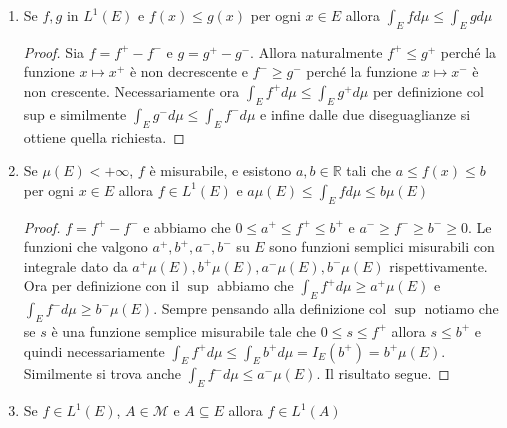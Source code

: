 \begin{enumerate}[label = \arabic*.]
\begin{proof}
         Ora possiamo estendere a \(f\) misurabile e \(\alpha \in \mathbb{R}\)
         scrivendo \(f = f^{+} - f^{-}\) e osservando che \(\alpha f =
         \text{sign}(\alpha) |\alpha| f^{+} - \text{sign}(\alpha) |\alpha|
         f^{-}\) dove se \(\alpha < 0\)  allora \(-\text{sign}(\alpha) f^{-}\) e
     \(- \text{sign}(\alpha) f^{+}\) sono non negative e misurabili.
    \end{proof}
    \item Se \(f, g\) in \(L^{1}(E)\) e \(f(x) \le g(x)\) per ogni \(x \in E\)
        allora \(\int_{E} f d\mu \le \int_{E} g d\mu\)
    \begin{proof}
        Sia \(f = f^{+} - f^{-}\) e \(g = g^{+} - g^{-}\). Allora naturalmente
        \(f^{+} \le g^{+}\) perché la funzione \(x \mapsto x^{+}\) è non
        decrescente e \(f^{-} \ge g^{-}\) perché la funzione \(x \mapsto x^{-}\)
        è non crescente. Necessariamente ora \(\int_E f^{+} d\mu \le \int_E
        g^{+} d\mu\) per definizione col sup e similmente \(\int_E g^{-} d\mu
        \le \int_E f^{-} d\mu\) e infine dalle due diseguaglianze si ottiene
        quella richiesta.
    \end{proof}
    \item Se \(\mu(E) < +\infty\), \(f\)  è misurabile, e esistono \(a, b \in
        \mathbb{R}\) tali che \(a \le f(x) \le b\) per ogni \(x \in E\) allora
        \(f \in L^{1}(E)\) e \(a \mu(E) \le \int_E f d\mu \le b\mu(E)\) 
    \begin{proof}
        \(f = f^{+} - f^{-}\) e abbiamo che \(0 \le a^+ \le f^{+} \le b^{+}\) e
        \(a^{-} \ge f^{-} \ge b^{-} \ge 0\). Le funzioni che valgono \(a^{+},
        b^{+}, a^{-}, b^{-}\) su \(E\) sono funzioni semplici misurabili con
        integrale dato da \(a^{+} \mu(E), b^{+} \mu(E), a^{-} \mu(E), b^{-}
        \mu(E)\) rispettivamente. Ora per definizione con il \(\sup\) abbiamo
        che \(\int_E f^{+} d\mu \ge a^{+} \mu(E)\) e \(\int_E f^{-} d\mu \ge
        b^{-} \mu(E)\). Sempre pensando alla definizione col \(\sup\) notiamo
        che se \(s\) è una funzione semplice misurabile tale che \(0 \le s \le
        f^{+}\) allora \(s \le b^{+}\) e quindi necessariamente \(\int_E f^{+}
        d\mu \le \int_E b^{+} d\mu = I_E(b^{+}) = b^{+} \mu(E)\). Similmente si
        trova anche \(\int_E f^{-}d\mu \le a^{-} \mu(E)\). Il risultato segue.
    \end{proof}
    \item Se \(f \in L^{1}(E)\), \(A \in \mathcal{M}\) e \(A \subseteq E \)
        allora \(f \in L^{1}(A)\) 

\end{enumerate}

